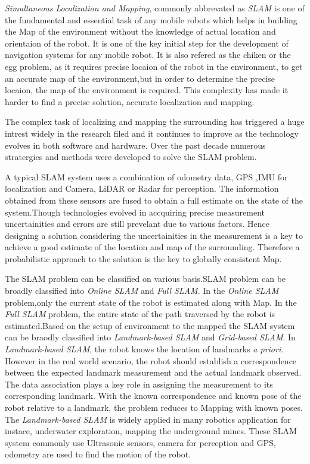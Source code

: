 
\textit{Simultaneous Localization and Mapping}, commonly abbrevated as \textit{SLAM} is one of the fundamental and essential task of any mobile robots which helps in building
the Map of the environment without the knowledge of actual location and orientaion of the robot. It is one of the key initial step for the development of
navigation systems for any mobile robot. It is also refered as  the chiken or the egg problem, as it requires precise locaion of the robot in the environment,
to get an accurate map of the environment,but in order to determine the precise locaion, the map of the environment is required. This complexity has made 
it harder to find a precise solution, accurate localization and mapping.

The complex task of localizing and mapping the surrounding has triggered a huge intrest widely in the research filed and it continues to  improve as the 
technology evolves in both software and hardware. Over the past decade numerous stratergies and methods were developed to solve the SLAM problem. 

A typical SLAM system uses a combination of odometry data, GPS ,IMU for localization and Camera, LiDAR or Radar for perception. The information obtained from 
these sensors are fused to obtain a full estimate on the state of the system.Though technologies evolved 
in accquiring precise measurement uncertainities and errors are still prevelant due to various factors. Hence designing a solution considering the uncertainities 
in the measurement is a key to achieve a good estimate of the location and map of the surrounding. Therefore a probabilistic approach to the solution is the key 
to globally consistent Map.

The SLAM problem can be classified on various basis.SLAM problem can be broadly classified into \textit{Online SLAM} and \textit{Full SLAM}. 
In the \textit{Online SLAM} problem,only the current state of the robot is estimated along with Map. In the \textit{Full SLAM} problem, the entire state of the 
path traversed by the robot is estimated.Based on the setup of environment to the mapped the SLAM system can be braodly classified into \textit{Landmark-based SLAM} and 
\textit{Grid-based SLAM}. In \textit{Landmark-based SLAM}, the robot knows the location of landmarks \textit{a priori}. 
However in the real world scenario, the robot should establish a correspondence between the expected landmark measurement and the actual landmark observed. 
The data association plays a key role in assigning the measurement to  its corresponding landmark.
With the known correspondence and known pose of the robot relative to a landmark, the problem reduces to Mapping with known poses. The \textit{Landmark-based SLAM}
is widely applied in many robotics application for instace, underwater exploration, mapping the underground mines. These SLAM system commonly use Ultrasonic
sensors, camera for perception and GPS, odometry are used to find the motion of the robot.

